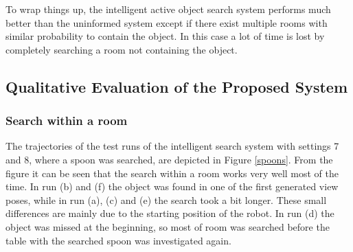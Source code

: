 To wrap things up, the intelligent active object search system performs much better than the uninformed system except if there exist multiple rooms with similar probability to contain the object. In this case a lot of time is lost by completely searching a room not containing the object. 

\subsection{Qualitative Evaluation of the Proposed System}

\subsubsection{Search within a room}

The trajectories of the test runs of the intelligent search system with settings 7 and 8, where a spoon was searched, are depicted in Figure \ref{spoons}. From the figure it can be seen that the search within a room works very well most of the time. In run (b) and (f) the object was found in one of the first generated view poses, while in run (a), (c) and (e) the search took a bit longer. These small differences are mainly due to the starting position of the robot. In run (d) the object was missed at the beginning, so most of room was searched before the table with the searched spoon was investigated again.

